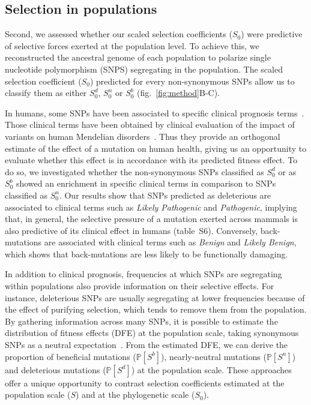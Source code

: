 \documentclass{article}
\newcommand{\proba}{\mathbb{P}}
\newcommand{\Sphy}{S_{0}}
\newcommand{\SphyDel}{\Sphy^{d}}
\newcommand{\SphyNeu}{\Sphy^{n}}
\newcommand{\SphyBen}{\Sphy^{b}}
\newcommand{\Spop}{S}
\newcommand{\SpopDel}{\Spop^{d}}
\newcommand{\SpopNeu}{\Spop^{n}}
\newcommand{\SpopBen}{\Spop^{b}}
\newcommand{\ProbaPopDel}{\proba [ \SpopDel]}
\newcommand{\ProbaPopNeu}{\proba [ \SpopNeu ]}
\newcommand{\ProbaPopBen}{\proba [ \SpopBen ]}
\begin{document}
    \subsection*{Selection in populations}
    Second, we assessed whether our scaled selection coefficients ($\Sphy$) were predictive of selective forces exerted at the population level.
    To achieve this, we reconstructed the ancestral genome of each population to polarize single nucleotide polymorphism (SNPS) segregating in the population.
    The scaled selection coefficient ($\Sphy$) predicted for every non-synonymous SNPs allow us to classify them as either $\SphyDel$, $\SphyNeu$ or $\SphyBen$ (fig.~\ref{fig:method}B-C).

    In humans, some SNPs have been associated to specific clinical prognosis terms~\cite{landrum_clinvar_2018}. Those clinical terms have been obtained by clinical evaluation of the impact of variants on human Mendelian disorders~\cite{landrum_clinvar_2018}. Thus they provide an orthogonal estimate of the effect of a mutation on human health, giving us an opportunity to evaluate whether this effect is in accordance with its predicted fitness effect.
    To do so, we investigated whether the non-synonymous SNPs classified as $\SphyDel$ or as $\SphyBen$ showed an enrichment in specific clinical terms in comparison to SNPs classified as $\SphyNeu$.
    Our results show that SNPs predicted as deleterious are associated to clinical terms such as \textit{Likely Pathogenic} and \textit{Pathogenic}, implying that, in general, the selective pressure of a mutation exerted across mammals is also predictive of its clinical effect in humans (table~S6).
    Conversely, back-mutations are associated with clinical terms such as \textit{Benign} and \textit{Likely Benign}, which shows that back-mutations are less likely to be functionally damaging.

    In addition to clinical prognosis, frequencies at which SNPs are segregating within populations also provide information on their selective effects.
    For instance, deleterious SNPs are usually segregating at lower frequencies because of the effect of purifying selection, which tends to remove them from the population.
    By gathering information across many SNPs, it is possible to estimate the distribution of fitness effects (DFE) at the population scale, taking synonymous SNPs as a neutral expectation~\cite{eyre-walker_distribution_2006, eyre-walker_estimating_2009, galtier_adaptive_2016, tataru_inference_2017}.
    From the estimated DFE, we can derive the proportion of beneficial mutations ($\ProbaPopBen$), nearly-neutral mutations ($\ProbaPopNeu$) and deleterious mutations ($\ProbaPopDel$) at the population scale.
    These approaches offer a unique opportunity to contrast selection coefficients estimated at the population scale ($\Spop$) and at the phylogenetic scale ($\Sphy$).
\end{document}
